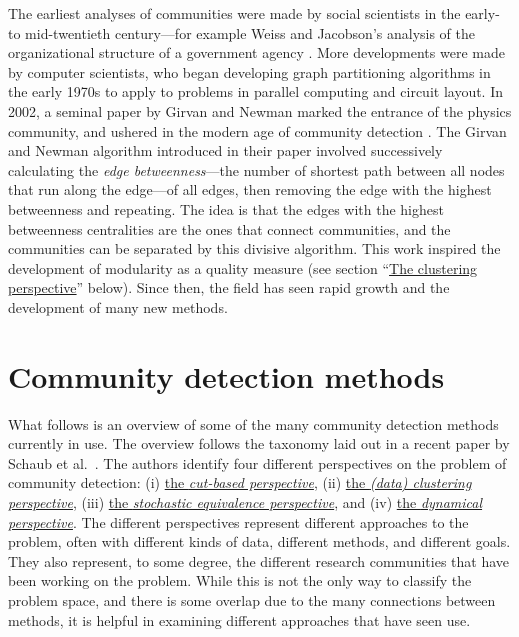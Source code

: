 The earliest analyses of communities were made by social scientists in
the early- to mid-twentieth century---for example Weiss and Jacobson's
analysis of the organizational structure of a government agency
\autocite{weiss_method_1955}. More developments were made by computer
scientists, who began developing graph partitioning algorithms in the
early 1970s to apply to problems in parallel computing and circuit
layout. In 2002, a seminal paper by Girvan and Newman
\autocite{girvan_community_2002} marked the entrance of the physics
community, and ushered in the modern age of community detection
\autocite{lancichinetti_community_2009}. The Girvan and Newman algorithm
introduced in their paper involved successively calculating the
\emph{edge betweenness}---the number of shortest path between all nodes
that run along the edge---of all edges, then removing the edge with the
highest betweenness and repeating. The idea is that the edges with the
highest betweenness centralities are the ones that connect communities,
and the communities can be separated by this divisive algorithm. This
work inspired the development of modularity as a quality measure (see
section ``\protect\hyperlink{the-clustering-perspective}{The clustering
perspective}'' below). Since then, the field has seen rapid growth and
the development of many new methods.

\hypertarget{community-detection-methods}{\section{Community detection
methods}\label{community-detection-methods}}

\protect\hyperlink{community-detection-methods}{}

What follows is an overview of some of the many community detection
methods currently in use. The overview follows the taxonomy laid out in
a recent paper by Schaub et al.~\autocite{schaub_many_2017}. The authors
identify four different perspectives on the problem of community
detection: (i) \protect\hyperlink{the-cut-based-perspective}{the
\emph{cut-based perspective}}, (ii)
\protect\hyperlink{the-clustering-perspective}{the \emph{(data)
clustering perspective}}, (iii)
\protect\hyperlink{the-stochastic-equivalence-perspective}{the
\emph{stochastic equivalence perspective}}, and (iv)
\protect\hyperlink{the-dynamical-perspective}{the \emph{dynamical
perspective}}. The different perspectives represent different approaches
to the problem, often with different kinds of data, different methods,
and different goals. They also represent, to some degree, the different
research communities that have been working on the problem. While this
is not the only way to classify the problem space, and there is some
overlap due to the many connections between methods, it is helpful in
examining different approaches that have seen use.

